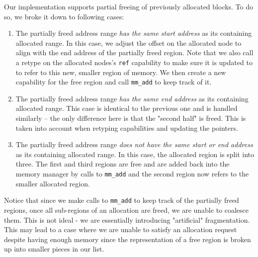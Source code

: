 Our implementation supports partial freeing of previously allocated blocks. To do so, we broke it down to following cases:
\begin{enumerate}
    \item The partially freed address range \textit{has the same start address} as its containing allocated range. In this case, we adjust the offset on the allocated node to align with the end address of the partially freed region. Note that we also call a retype on the allocated nodes's \verb|ref| capability to make sure it is updated to to refer to this new, smaller region of memory. We then create a new capability for the free region and call \verb|mm_add| to keep track of it.
    \item The partially freed address range \textit{has the same end address} as its containing allocated range. This case is identical to the previous one and is handled similarly -- the only difference here is that the "second half" is freed. This is taken into account when retyping capabilities and updating the pointers.
    \item The partially freed address range \textit{does not have the same start or end address} as its containing allocated range. In this case, the allocated region is split into three. The first and third regions are free and are added back into the memory manager by calls to \verb|mm_add| and the second region now refers to the smaller allocated region.
\end{enumerate}

Notice that since we make calls to \verb|mm_add| to keep track of the partially freed regions, once all sub-regions of an allocation are freed, we are unable to coalesce them. This is not ideal - we are essentially introducing "artificial" fragmentation. This may lead to a case where we are unable to satisfy an allocation request despite having enough memory since the representation of a free region is broken up into smaller pieces in our list.




